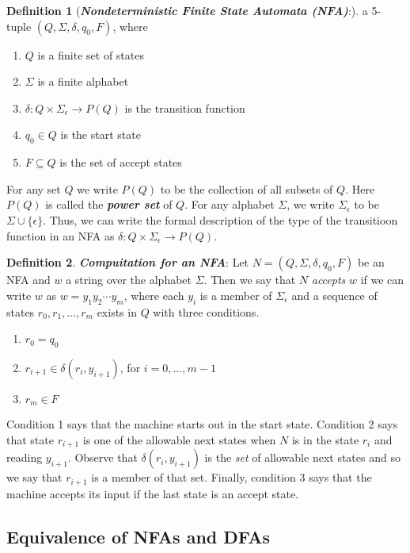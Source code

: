 \documentclass{article}
\theoremstyle{definition}
\newtheorem{definition}{Definition}[section]
\newcommand{\define}[1]{\textbf{\textit{#1}}}
\begin{document}
\begin{definition}[\define{Nondeterministic Finite State Automata (NFA)}:] 
 a 5-tuple $(Q,\Sigma,\delta,q_0,F)$, where
  \begin{enumerate}
    \item $Q$ is a finite set of states 
    \item $\Sigma$ is a finite alphabet 
    \item $\delta: Q \times \Sigma_{\epsilon} \rightarrow P(Q)$ is the transition function 
    \item $q_0 \in Q$ is the start state 
    \item $F \subseteq Q$ is the set of accept states
  \end{enumerate}
  For any set $Q$ we write $P(Q)$ to be the collection of all subsets of $Q$. Here $P(Q)$ is called the \define{power set} of $Q$. For any alphabet $\Sigma$, we write $\Sigma_{\epsilon}$ to be $\Sigma \cup \{\epsilon\}$. Thus, we can write the formal description of the type of the transitioon function in an NFA as $\delta: Q \times \Sigma_{\epsilon} \rightarrow P(Q)$. 
\end{definition}

\begin{definition}{\define{Compuitation for an NFA}:}
  Let $N=(Q,\Sigma,\delta,q_0,F)$ be an NFA and $w$ a string over the alphabet $\Sigma$. Then we say that $N$ \emph{accepts} $w$ if we can write $w$ as $w = y_{1}y_{2}\cdots y_{m}$, where each $y_i$ is a member of $\Sigma_{\epsilon}$ and a sequence of states $r_0 , r_1 , \dots , r_{m}$ exists in $Q$ with three conditions.  \\ 
  \begin{enumerate}
    \item $r_0 = q_0$ 
    \item $r_{i + 1} \in \delta(r_{i}, y_{i+1})$, for $i = 0, \dots , m-1$ 
    \item $r_m \in F$
  \end{enumerate}
  Condition 1 says that the machine starts out in the start state. Condition 2 says that state $r_{i+1}$ is one of the allowable next states when $N$ is in the state $r_i$ and reading $y_{i+1}$. Observe that $\delta(r_{i},y_{i+1})$ is the \emph{set} of allowable next states and so we say that $r_{i+1}$ is a member of that set. Finally, condition 3 says that the machine accepts its input if the last state is an accept state. 
\end{definition}

\subsection{Equivalence of NFAs and DFAs}
\end{document}
